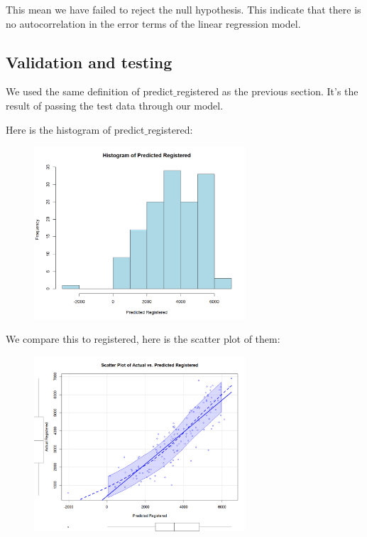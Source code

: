 This mean we have failed to reject the null hypothesis. This indicate that there is no autocorrelation in the error terms of the linear regression model.

\subsection{Validation and testing}

We used the same definition of predict$\_$registered as the previous section. It's the result of passing the test data through our model.

Here is the histogram of predict$\_$registered:


\begin{figure}[H]
\centering
\includegraphics[width=0.7\textwidth]{img/h1b22.png}
\label{fig:scaled_revenue_distribution}
\end{figure}

We compare this to registered, here is the scatter plot of them:

\begin{figure}[H]
\centering
\includegraphics[width=0.7\textwidth]{img/h2b22.png}
\label{fig:scaled_revenue_distribution}
\end{figure}

